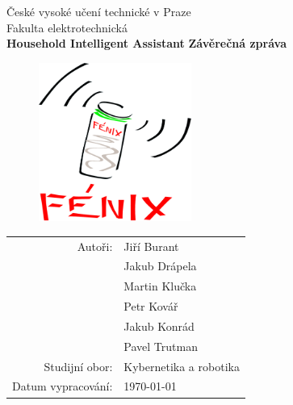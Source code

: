 \documentclass[12pt,a4paper]{article}
\author{Jakub Drápela}
\begin{document}
\pagestyle{empty}


	\begin{center}

\large

České vysoké učení technické v Praze\\
\medskip
Fakulta elektrotechnická\\[2cm]
{\LARGE\bfseries Household Intelligent Assistant}
\vfill
{\LARGE\bfseries Závěrečná zpráva}
\vfill
\begin{figure}[h!]
\begin{center}
\includegraphics[width = 5cm]{logo.pdf} 
\end{center}
\end{figure}
\vfill

\begin{tabular}{rl}

Autoři: & Jiří Burant \\
\noalign{\vspace{1mm}}
		& Jakub Drápela \\
		\noalign{\vspace{1mm}}
		& Martin Klučka\\
		\noalign{\vspace{1mm}}
		& Petr Kovář \\
		\noalign{\vspace{1mm}}
		& Jakub Konrád\\
		\noalign{\vspace{1mm}}
		& Pavel Trutman\\
\noalign{\vspace{2mm}}
Studijní obor: & Kybernetika a robotika \\
\noalign{\vspace{2mm}}
Datum vypracování: & \today\\
\end{tabular}

\end{center}
\end{document}
